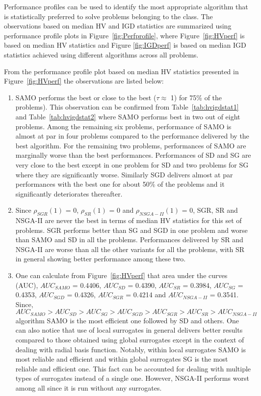 Performance profiles can be used to identify the most appropriate algorithm that is statistically preferred to solve problems belonging to the class. The observations based on median HV and IGD statistics are summarized using performance profile plots in Figure~\ref{fig:Perfprofile}, where Figure~\ref{fig:HVperf} is based on median HV statistics and Figure \ref{fig:IGDperf} is based on median IGD statistics achieved using different algorithms across all problems.

From the performance profile plot based on median HV statistics presented in Figure~\ref{fig:HVperf} the observations are listed below:

\begin{enumerate} 
	
	\item SAMO performs the best or close to the best ($\tau \approx$ 1) for 75\% of the problems). This observation can be confirmed from Table~\ref{tab:hvigdstat1} and Table~\ref{tab:hvigdstat2} where SAMO performs best in two out of eight problems. Among the remaining six problems, performance of SAMO is almost at par in four problems compared to the performance delivered by the best algorithm. For the remaining two problems, performances of SAMO are marginally worse than the best performances. Performances of SD and SG are very close to the best except in one problem for SD and two problems for SG where they are significantly worse. Similarly SGD delivers almost at par performances with the best one for about 50\% of the problems and it significantly deteriorates thereafter.
	\item Since $\rho_{SGR}(1)$ = 0, $\rho_{SR}(1)$ = 0 and $\rho_{NSGA-II}(1)$ = 0, SGR, SR and NSGA-II are never the best in terms of median HV statistics for this set of problems. SGR performs better than SG and SGD in one problem and worse than SAMO and SD in all the problems. Performances delivered by SR and NSGA-II are worse than all the other variants for all the problems, with SR in general showing better performance among these two. 
	\item One can calculate from Figure~\ref{fig:HVperf} that area under the curves (AUC), $AUC_{SAMO}$ = 0.4406, $AUC_{SD}$ = 0.4390, $AUC_{SR}$ = 0.3984, $AUC_{SG}$ = 0.4353, $AUC_{SGD}$ = 0.4326, $AUC_{SGR}$ = 0.4214 and $AUC_{NSGA-II}$ = 0.3541. Since, $AUC_{SAMO} > AUC_{SD} > AUC_{SG} > AUC_{SGD} > AUC_{SGR} > AUC_{SR} > AUC_{NSGA-II}$ algorithm SAMO is the most efficient one followed by SD and others. One can also notice that use of local surrogates in general delivers better results compared to those obtained using global surrogates except in the context of dealing with radial basis function. Notably, within local surrogates SAMO is most reliable and efficient and within global surrogates SG is the most reliable and efficient one. This fact can be accounted for dealing with multiple types of surrogates instead of a single one. However, NSGA-II performs worst among all since it is run without any surrogates. 
\end{enumerate}


